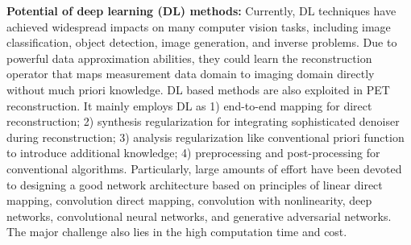 \documentclass[11pt,a4paper]{article}
\begin{document}
    \noindent\textbf{Potential of deep learning (DL) methods:} Currently, DL techniques have achieved widespread impacts on many computer vision tasks, including image classification, object detection, image generation, and inverse problems. Due to powerful data approximation abilities, they could learn the reconstruction operator that maps measurement data domain to imaging domain directly without much priori knowledge. DL based methods are also exploited in PET reconstruction. It mainly employs DL as 1) end-to-end mapping for direct reconstruction; 2) synthesis regularization for integrating sophisticated denoiser during reconstruction; 3) analysis regularization like conventional priori function to introduce additional knowledge; 4) preprocessing and post-processing for conventional algorithms. Particularly, large amounts of effort have been devoted to designing a good network architecture based on principles of linear direct mapping, convolution direct mapping, convolution with nonlinearity, deep networks, convolutional neural networks, and generative adversarial networks. The major challenge also lies in the high computation time and cost\cite{aj2020dl}.  
\vspace{-0.5cm}
{\small


}
\end{document}
